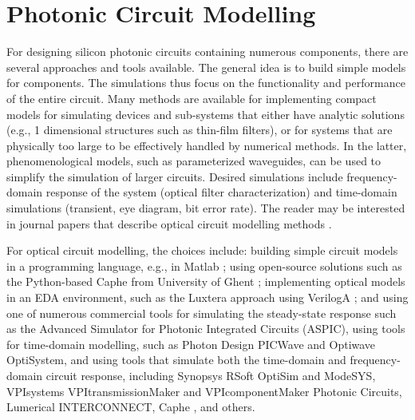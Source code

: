 \documentclass[journal]{spie}
\begin{document}
\section{Photonic Circuit Modelling}


For designing silicon photonic circuits containing numerous components, there are several approaches and tools available.    The general idea is to build simple models for components.  The simulations thus focus on the functionality and performance of the entire circuit.  
%
Many methods are available for implementing compact models for simulating devices and sub-systems that either have analytic solutions (e.g., 1 dimensional structures such as thin-film filters), or for systems that are physically too large to be effectively handled by numerical methods.  In the latter, phenomenological models, such as parameterized waveguides, can be used to simplify the simulation of larger circuits.
%
Desired simulations include frequency-domain response of the system (optical filter characterization) and time-domain simulations (transient, eye diagram, bit error rate).  The reader may be interested in journal papers that describe optical circuit modelling methods \cite{fiers2012time-domain, melati2012validation, shibata1998generalized-scattering-matrix}.  

For optical circuit modelling, the choices include: building simple circuit models in a programming language, e.g., in Matlab \cite{wartak2013computational}; using open-source solutions such as the Python-based Caphe from University of Ghent \cite{fiers2012time-domain}; implementing optical models in an EDA environment, such as the Luxtera approach using VerilogA \cite{pinguet2011cmos}; and using one of numerous commercial tools for simulating the steady-state response such as the Advanced Simulator for Photonic Integrated Circuits (ASPIC), using tools for time-domain modelling, such as Photon Design PICWave and Optiwave OptiSystem, and using tools that simulate both the time-domain and frequency-domain circuit response, including Synopsys RSoft OptiSim and ModeSYS, VPIsystems VPItransmissionMaker and VPIcomponentMaker Photonic Circuits, Lumerical INTERCONNECT, Caphe \cite{fiers2012time-domain}, and others.  
\end{document}
